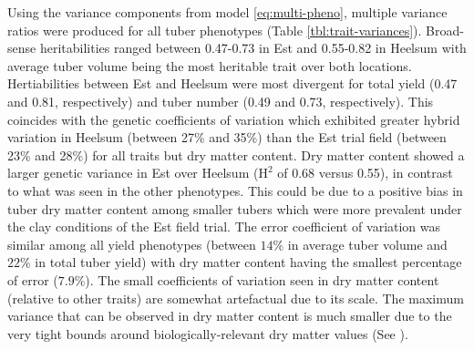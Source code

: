 Using the variance components from model \ref{eq:multi-pheno}, multiple variance ratios were produced for all tuber phenotypes (Table \ref{tbl:trait-variances}). Broad-sense heritabilities ranged between 0.47-0.73 in Est and 0.55-0.82 in Heelsum with average tuber volume being the most heritable trait over both locations. Hertiabilities between Est and Heelsum were most divergent for total yield (0.47 and 0.81, respectively) and tuber number (0.49 and 0.73, respectively). This coincides with the genetic coefficients of variation which exhibited greater hybrid variation in Heelsum (between 27\% and 35\%) than the Est trial field (between 23\% and 28\%) for all traits but dry matter content. Dry matter content showed a larger genetic variance in Est over Heelsum (\(\mathrm H^2\) of 0.68 versus 0.55), in contrast to what was seen in the other phenotypes. This could be due to a positive bias in tuber dry matter content among smaller tubers which were more prevalent under the clay conditions of the Est field trial. The error coefficient of variation was similar among all yield phenotypes (between \(14\%\) in average tuber volume and \(22\%\) in total tuber yield) with dry matter content having the smallest percentage of error (\(7.9\%\)). The small coefficients of variation seen in dry matter content (relative to other traits) are somewhat artefactual due to its scale. The maximum variance that can be observed in dry matter content is much smaller due to the very tight bounds around biologically-relevant dry matter values (See ).

